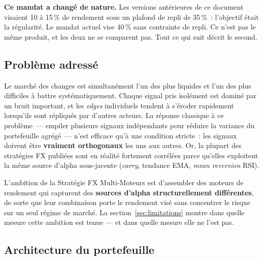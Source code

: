 \begin{insightbox}
\textbf{Ce mandat a changé de nature.} Les versions antérieures de ce document visaient 10 à 15\,\% de rendement sous un plafond de repli de 35\,\%~: l'objectif était la régularité. Le mandat actuel vise 40\,\% sans contrainte de repli. Ce n'est pas le même produit, et les deux ne se comparent pas. Tout ce qui suit décrit le second.
\end{insightbox}

\subsection{Problème adressé}

Le marché des changes est simultanément l'un des plus liquides et l'un des plus difficiles à battre systématiquement. Chaque signal pris isolément est dominé par un bruit important, et les \emph{edges} individuels tendent à s'éroder rapidement lorsqu'ils sont répliqués par d'autres acteurs. La réponse classique à ce problème~--- empiler plusieurs signaux indépendants pour réduire la variance du portefeuille agrégé~--- n'est efficace qu'à une condition stricte~: les signaux doivent être \textbf{vraiment orthogonaux} les uns aux autres. Or, la plupart des stratégies FX publiées sont en réalité fortement corrélées parce qu'elles exploitent la même source d'alpha sous-jacente (\emph{carry}, tendance EMA, \emph{mean reversion} RSI).

\begin{thesisbox}
L'ambition de la Stratégie FX Multi-Moteurs est d'assembler des moteurs de rendement qui capturent des \textbf{sources d'alpha structurellement différentes}, de sorte que leur combinaison porte le rendement visé sans concentrer le risque sur un seul régime de marché. La section~\ref{sec:limitations} montre dans quelle mesure cette ambition est tenue --- et dans quelle mesure elle ne l'est pas.
\end{thesisbox}

\subsection{Architecture du portefeuille}

